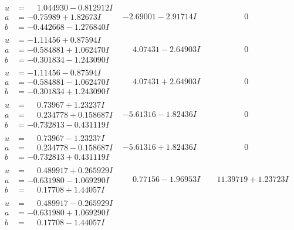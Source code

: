 \documentclass[1p]{elsarticle_modified}
\theoremstyle{definition}
\begin{document}
$$\begin{array}{c|c|c}
\begin{aligned}
u &= \phantom{-}1.044930 - 0.812912 I \\
a &= -0.75989 + 1.82673 I \\
b &= -0.442668 - 1.276840 I\end{aligned}
 & -2.69001 - 2.91714 I & \phantom{-0.000000 } 0 \\ \hline\begin{aligned}
u &= -1.11456 + 0.87594 I \\
a &= -0.584881 + 1.062470 I \\
b &= -0.301834 - 1.243090 I\end{aligned}
 & \phantom{-}4.07431 - 2.64903 I & \phantom{-0.000000 } 0 \\ \hline\begin{aligned}
u &= -1.11456 - 0.87594 I \\
a &= -0.584881 - 1.062470 I \\
b &= -0.301834 + 1.243090 I\end{aligned}
 & \phantom{-}4.07431 + 2.64903 I & \phantom{-0.000000 } 0 \\ \hline\begin{aligned}
u &= \phantom{-}0.73967 + 1.23237 I \\
a &= \phantom{-}0.234778 + 0.158687 I \\
b &= -0.732813 - 0.431119 I\end{aligned}
 & -5.61316 - 1.82436 I & \phantom{-0.000000 } 0 \\ \hline\begin{aligned}
u &= \phantom{-}0.73967 - 1.23237 I \\
a &= \phantom{-}0.234778 - 0.158687 I \\
b &= -0.732813 + 0.431119 I\end{aligned}
 & -5.61316 + 1.82436 I & \phantom{-0.000000 } 0 \\ \hline\begin{aligned}
u &= \phantom{-}0.489917 + 0.265929 I \\
a &= -0.631980 - 1.069290 I \\
b &= \phantom{-}0.17708 + 1.44057 I\end{aligned}
 & \phantom{-}0.77156 - 1.96953 I & \phantom{-}11.39719 + 1.23723 I \\ \hline\begin{aligned}
u &= \phantom{-}0.489917 - 0.265929 I \\
a &= -0.631980 + 1.069290 I \\
b &= \phantom{-}0.17708 - 1.44057 I\end{aligned}

\end{array}$$
\end{document}
